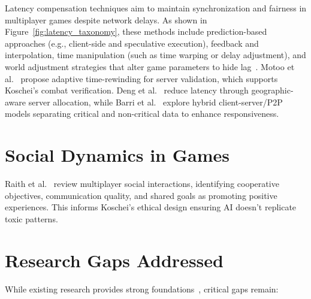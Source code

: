 Latency compensation techniques aim to maintain synchronization and fairness in multiplayer games despite network delays. As shown in Figure~\ref{fig:latency_taxonomy}, these methods include prediction-based approaches (e.g., client-side and speculative execution), feedback and interpolation, time manipulation (such as time warping or delay adjustment), and world adjustment strategies that alter game parameters to hide lag~\cite{motoo2021}. Motoo et al.~\cite{motoo2021} propose adaptive time-rewinding for server validation, which supports Koschei’s combat verification. Deng et al.~\cite{deng2018} reduce latency through geographic-aware server allocation, while Barri et al.~\cite{barri2016} explore hybrid client-server/P2P models separating critical and non-critical data to enhance responsiveness.
\section{Social Dynamics in Games}

Raith et al.~\cite{raith2021} review multiplayer social interactions, identifying cooperative objectives, communication quality, and shared goals as promoting positive experiences. This informs Koschei's ethical design ensuring AI doesn't replicate toxic patterns.

\section{Research Gaps Addressed}

While existing research provides strong foundations~\cite{park2023generative,hagendorff2023,mikros2023,motoo2021}, critical gaps remain:



